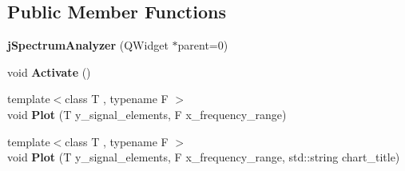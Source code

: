 \subsection*{Public Member Functions}
\begin{DoxyCompactItemize}
\item 
{\bfseries j\+Spectrum\+Analyzer} (Q\+Widget $\ast$parent=0)\hypertarget{classjaspl_1_1j_spectrum_analyzer_a5101faac87201a91ea02e2afcbdf33db}{}\label{classjaspl_1_1j_spectrum_analyzer_a5101faac87201a91ea02e2afcbdf33db}

\item 
void {\bfseries Activate} ()\hypertarget{classjaspl_1_1j_spectrum_analyzer_a778e2eef7d689c8b9f4df3d0894af4a2}{}\label{classjaspl_1_1j_spectrum_analyzer_a778e2eef7d689c8b9f4df3d0894af4a2}

\item 
{\footnotesize template$<$class T , typename F $>$ }\\void {\bfseries Plot} (T y\+\_\+signal\+\_\+elements, F x\+\_\+frequency\+\_\+range)\hypertarget{classjaspl_1_1j_spectrum_analyzer_a1a9a7d7efd93e37a1bd76a7123cf4caf}{}\label{classjaspl_1_1j_spectrum_analyzer_a1a9a7d7efd93e37a1bd76a7123cf4caf}

\item 
{\footnotesize template$<$class T , typename F $>$ }\\void {\bfseries Plot} (T y\+\_\+signal\+\_\+elements, F x\+\_\+frequency\+\_\+range, std\+::string chart\+\_\+title)\hypertarget{classjaspl_1_1j_spectrum_analyzer_aff0590acca8571ced9b05a6d0f7932fb}{}\label{classjaspl_1_1j_spectrum_analyzer_aff0590acca8571ced9b05a6d0f7932fb}

\end{DoxyCompactItemize}
